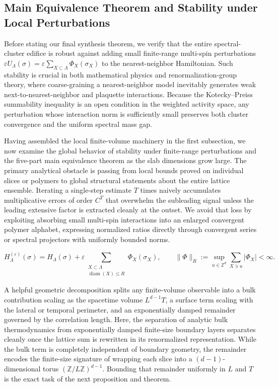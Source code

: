 \documentclass[11pt]{article}
\theoremstyle{definition}
\begin{document}
\subsection{Main Equivalence Theorem and Stability under Local Perturbations}
\label{subsec:s10b}

Before stating our final synthesis theorem, we verify that the entire
spectral-cluster edifice is robust against adding small finite-range multi-spin
perturbations $\varepsilon U_\Lambda(\sigma) = \varepsilon \sum_{X \subset \Lambda}
\Phi_X(\sigma_X)$ to the nearest-neighbor Hamiltonian. Such stability is crucial in
both mathematical physics and renormalization-group theory, where coarse-graining a
nearest-neighbor model inevitably generates weak next-to-nearest-neighbor and
plaquette interactions. Because the Kotecky--Preiss summability inequality is an
open condition in the weighted activity space, any perturbation whose interaction
norm is sufficiently small preserves both cluster convergence and the uniform
spectral mass gap.

Having assembled the local finite-volume machinery in the first subsection, we now
examine the global behavior of stability under finite-range perturbations and the
five-part main equivalence theorem as the slab dimensions grow large. The primary
analytical obstacle is passing from local bounds proved on individual slices or
polymers to global structural statements about the entire lattice ensemble.
Iterating a single-step estimate $T$ times naively accumulates multiplicative errors
of order $C^T$ that overwhelm the subleading signal unless the leading extensive
factor is extracted cleanly at the outset. We avoid that loss by exploiting
absorbing small multi-spin interactions into an enlarged convergent polymer
alphabet, expressing normalized ratios directly through convergent series or
spectral projectors with uniformly bounded norms.

\[
  H_\Lambda^{(\varepsilon)}(\sigma) = H_\Lambda(\sigma) + \varepsilon \sum_{\substack{X \subset \Lambda \\ \operatorname{diam}(X) \le R}} \Phi_X(\sigma_X), \qquad \|\Phi\|_{R} := \sup_{u \in \mathbb{Z}^d} \sum_{X \ni u} |\Phi_X| < \infty.
\]

A helpful geometric decomposition splits any finite-volume observable into a bulk
contribution scaling as the spacetime volume $L^{d-1} T$, a surface term scaling
with the lateral or temporal perimeter, and an exponentially damped remainder
governed by the correlation length. Here, the separation of analytic bulk
thermodynamics from exponentially damped finite-size boundary layers separates
cleanly once the lattice sum is rewritten in its renormalized representation. While
the bulk term is completely independent of boundary geometry, the remainder encodes
the finite-size signature of wrapping each slice into a $(d-1)$-dimensional torus
$(\mathbb{Z}/L\mathbb{Z})^{d-1}$. Bounding that remainder uniformly in $L$ and $T$
is the exact task of the next proposition and theorem.
\end{document}
